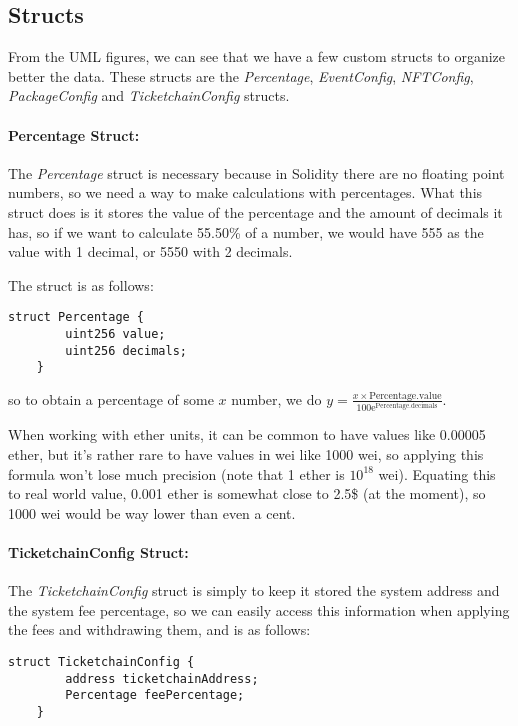 \subsection{Structs}
\label{subsec:structs}

From the UML figures, we can see that we have a few custom structs to organize
better the data. These structs are the \textit{Percentage},
\textit{EventConfig}, \textit{NFTConfig}, \textit{PackageConfig} and
\textit{TicketchainConfig} structs.

\paragraph{Percentage Struct:} The \textit{Percentage} struct is necessary because in Solidity there are no
floating point numbers, so we need a way to make calculations with percentages.
What this struct does is it stores the value of the percentage and the amount
of decimals it has, so if we want to calculate 55.50\% of a number, we would
have 555 as the value with 1 decimal, or 5550 with 2 decimals.

The struct is as follows:
\begin{lstlisting}[caption=Percentage struct]
    struct Percentage {
        uint256 value;
        uint256 decimals;
    }
\end{lstlisting}
so to obtain a percentage of some $x$ number, we do $y = \frac{x \times
		\text{Percentage.value}}{100\mathrm{e}^\text{Percentage.decimals}}$.

When working with ether units, it can be common to have values like 0.00005
ether, but it's rather rare to have values in wei like 1000 wei, so applying
this formula won't lose much precision (note that 1 ether is $10^{18}$ wei).
Equating this to real world value, 0.001 ether is somewhat close to 2.5\$ (at
the moment), so 1000 wei would be way lower than even a cent.

\paragraph{TicketchainConfig Struct:} The \textit{TicketchainConfig} struct is simply to keep it stored the system
address and the system fee percentage, so we can easily access this information
when applying the fees and withdrawing them, and is as follows:
\begin{lstlisting}[caption=TicketchainConfig struct]
    struct TicketchainConfig {
        address ticketchainAddress;
        Percentage feePercentage;
    }
\end{lstlisting}

